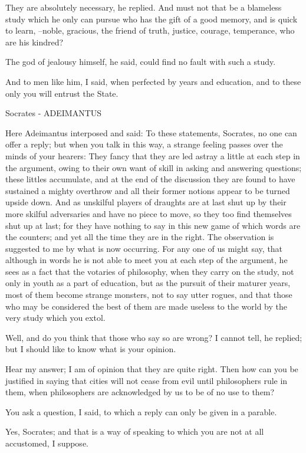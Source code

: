 They are absolutely necessary, he replied.
And must not that be a blameless study which he only can pursue who has the gift of a good memory, and is quick to learn, --noble, gracious, the friend of truth, justice, courage, temperance, who are his kindred?

The god of jealousy himself, he said, could find no fault with such a study.

And to men like him, I said, when perfected by years and education, and to these only you will entrust the State.

Socrates - ADEIMANTUS

Here Adeimantus interposed and said: To these statements, Socrates, no one can offer a reply; but when you talk in this way, a strange feeling passes over the minds of your hearers: They fancy that they are led astray a little at each step in the argument, owing to their own want of skill in asking and answering questions; these littles accumulate, and at the end of the discussion they are found to have sustained a mighty overthrow and all their former notions appear to be turned upside down. And as unskilful players of draughts are at last shut up by their more skilful adversaries and have no piece to move, so they too find themselves shut up at last; for they have nothing to say in this new game of which words are the counters; and yet all the time they are in the right. The observation is suggested to me by what is now occurring. For any one of us might say, that although in words he is not able to meet you at each step of the argument, he sees as a fact that the votaries of philosophy, when they carry on the study, not only in youth as a part of education, but as the pursuit of their maturer years, most of them become strange monsters, not to say utter rogues, and that those who may be considered the best of them are made useless to the world by the very study which you extol.

Well, and do you think that those who say so are wrong?
I cannot tell, he replied; but I should like to know what is your opinion.

Hear my answer; I am of opinion that they are quite right.
Then how can you be justified in saying that cities will not cease from evil until philosophers rule in them, when philosophers are acknowledged by us to be of no use to them?

You ask a question, I said, to which a reply can only be given in a parable.

Yes, Socrates; and that is a way of speaking to which you are not at all accustomed, I suppose.

